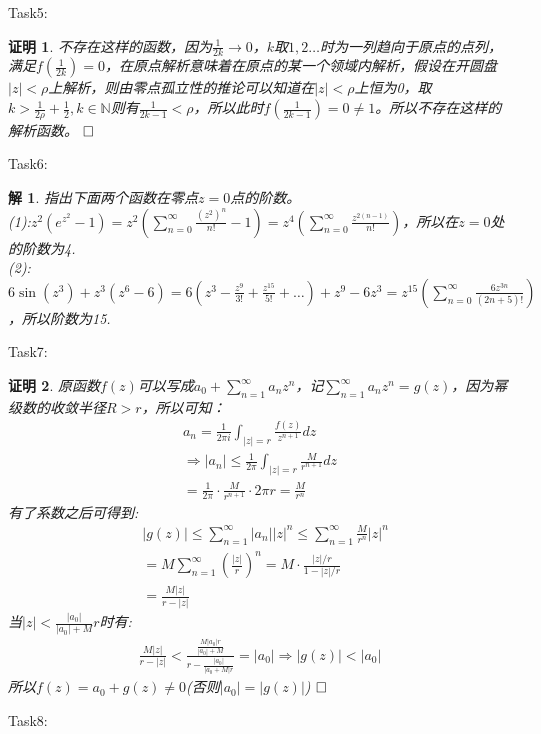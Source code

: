 \documentclass{ctexart}
\newcommand{\。}{．} %
\newenvironment{lanse}{
    \begin{tcolorbox}[breakable,enhanced, colback=qlan, boxrule=0pt, frame hidden,
        borderline west={0.7mm}{0.1mm}{slan}]
    }
    {\end{tcolorbox}}
\theoremstyle{t} %
\newtheorem*{tmhj}{\color{slan} 解}
\newtheorem*{zmhj}{\color{slan} 证明}
\newenvironment{zm}{\begin{lanse}\begin{zmhj}}{$\hfill \square$\end{zmhj}\end{lanse}}
\newenvironment{tm}{\begin{lanse}\begin{tmhj}}{\end{tmhj}\end{lanse}}
\begin{document}
Task5:
\begin{zm}
    不存在这样的函数，因为$\frac{1}{2k}\to 0$，$k$取$1,2\dots$时为一列趋向于原点的点列，满足$f(\frac{1}{2k})=0$，在原点解析意味着在原点的某一个领域内解析，假设在开圆盘$|z|<\rho$上解析，则由零点孤立性的推论可以知道在$|z|<\rho$上恒为0，取$k>\frac{1}{2\rho}+\frac{1}{2},k\in\mathbb{N}$则有$\frac{1}{2k-1}<\rho$，所以此时$f(\frac{1}{2k-1})=0\neq 1$。所以不存在这样的解析函数。
\end{zm}
Task6:
\begin{tm}
    指出下面两个函数在零点$z=0$点的阶数。\\
    (1):$z^2(e^{z^2}-1)=z^2\left(\sum_{n=0}^{\infty}\frac{(z^2)^n}{n!}-1\right)=z^4\left(\sum_{n=0}^{\infty}\frac{z^{2(n-1)}}{n!}\right)$，所以在$z=0$处的阶数为4.\\
    (2):$6\sin(z^3)+z^3(z^6-6)=6(z^3-\frac{z^9}{3!}+\frac{z^{15}}{5!}+\dots)+z^9-6z^3=z^{15}\left(\sum_{n=0}^{\infty}\frac{6z^{3n}}{(2n+5)!}\right)$，所以阶数为15.
\end{tm}
Task7:
\begin{zm}
    原函数$f(z)$可以写成$a_0+\sum_{n=1}^{\infty}a_nz^n$，记$\sum_{n=1}^{\infty}a_nz^n=g(z)$，因为幂级数的收敛半径$R>r$，所以可知：
    \begin{align*}
        a_n=\frac{1}{2\pi i}\int_{|z|=r}\frac{f(z)}{z^{n+1}}dz\\
        \Rightarrow |a_n|\le \frac{1}{2\pi}\int_{|z|=r}\frac{M}{r^{n+1}}dz\\
        =\frac{1}{2\pi}\cdot \frac{M}{r^{n+1}}\cdot 2\pi r=\frac{M}{r^{n}}
    \end{align*}
    有了系数之后可得到:
    \begin{align*}
        &|g(z)|\le \sum_{n=1}^{\infty}|a_n||z|^n\le \sum_{n=1}^{\infty}\frac{M}{r^n}|z|^n\\
        &=M\sum_{n=1}^{\infty}\left(\frac{|z|}{r}\right)^n=M\cdot \frac{|z|/r}{1-|z|/r}\\
        &=\frac{M|z|}{r-|z|}
    \end{align*}
    当$|z|<\frac{|a_0|}{|a_0|+M}r$时有:
    \begin{align*}
        \frac{M|z|}{r-|z|}<\frac{\frac{M|a_0|r}{|a_0|+M}}{r-\frac{|a_0|}{|a_0+M|r}}=|a_0|\Rightarrow |g(z)|<|a_0|
    \end{align*}
    所以$f(z)=a_0+g(z)\neq 0$(否则$|a_0|=|g(z)|$)
\end{zm}
Task8:
\end{document}
